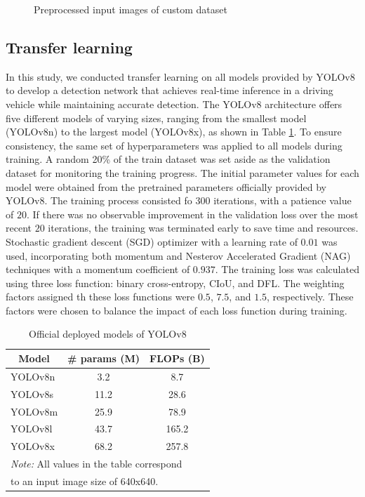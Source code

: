 \begin{figure}[t!]
\caption{Preprocessed input images of custom dataset}
\label{fig:custom_dataset}%
\end{figure}


\subsection{Transfer learning}
\label{sec:exp_transfer}
In this study, we conducted transfer learning on all models provided by YOLOv8 \cite{YOLOv8} to develop a detection network that achieves real-time inference in a driving vehicle while maintaining accurate detection.
The YOLOv8 architecture offers five different models of varying sizes, ranging from the smallest model (YOLOv8n) to the largest model (YOLOv8x), as shown in Table \ref{tab:yolov8}.
To ensure consistency, the same set of hyperparameters was applied to all models during training.
A random 20\% of the train dataset was set aside as the validation dataset for monitoring the training progress.
The initial parameter values for each model were obtained from the pretrained parameters officially provided by YOLOv8.
The training process consisted fo $300$ iterations, with a patience value of $20$.
If there was no observable improvement in the validation loss over the most recent $20$ iterations, the training was terminated early to save time and resources.
Stochastic gradient descent (SGD) optimizer with a learning rate of $0.01$ was used, incorporating both momentum and Nesterov Accelerated Gradient (NAG) techniques \cite{sutskever2013importance} with a momentum coefficient of $0.937$.
The training loss was calculated using three loss function: binary cross-entropy, CIoU, and DFL.
The weighting factors assigned th these loss functions were $0.5$, $7.5$, and $1.5$, respectively.
These factors were chosen to balance the impact of each loss function during training.

\begin{table}[h]
    \caption{Official deployed models of YOLOv8}
    \label{tab:yolov8}
    \begin{tabular}{lcc}
    \toprule
    \multicolumn{1}{c}{Model}   & \# params (M) & FLOPs (B) \\
    \midrule
    YOLOv8n & 3.2        & 8.7       \\
    YOLOv8s & 11.2       & 28.6      \\
    YOLOv8m & 25.9       & 78.9      \\
    YOLOv8l & 43.7       & 165.2     \\
    YOLOv8x & 68.2       & 257.8     \\
    \bottomrule
    \multicolumn{3}{l}{\textit{Note:} All values in the table correspond}\\
    \multicolumn{3}{l}{\qquad \; to an input image size of 640x640.}
    \end{tabular}%
\end{table}

